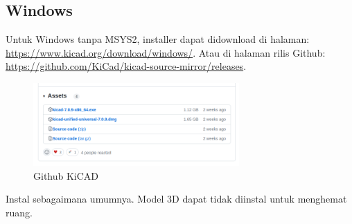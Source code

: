 \documentclass[12pt]{book}
\begin{document}
	\subsection{Windows}
	
	Untuk Windows tanpa MSYS2, installer dapat didownload di halaman: \url{https://www.kicad.org/download/windows/}.
	Atau di halaman rilis Github: \url{https://github.com/KiCad/kicad-source-mirror/releases}.
	
	\begin{figure}[!ht]
		\centering
		\includegraphics[width=0.7\textwidth]{images/kicad/kicadgithub}
		\caption{Github KiCAD}
	\end{figure}
	
	Instal sebagaimana umumnya. Model 3D dapat tidak diinstal untuk menghemat ruang.
	
\end{document}
